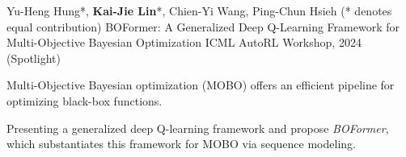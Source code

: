 

\begin{cventries}


  \cventry
  {Yu-Heng Hung*, \textbf{Kai-Jie Lin}*, Chien-Yi Wang, Ping-Chun Hsieh (* denotes equal contribution)} %
  {BOFormer: A Generalized Deep Q-Learning Framework for Multi-Objective Bayesian Optimization} %
  {ICML AutoRL Workshop, 2024   (Spotlight)} %
  {} %
  {
    \begin{cvitems} %
      \item {Multi-Objective Bayesian optimization (MOBO) offers an efficient pipeline for optimizing black-box functions.}
      \item {Presenting a generalized deep Q-learning framework and propose \textit{BOFormer}, which substantiates this framework for MOBO via sequence modeling.}
    \end{cvitems}
  }
  

\end{cventries}
